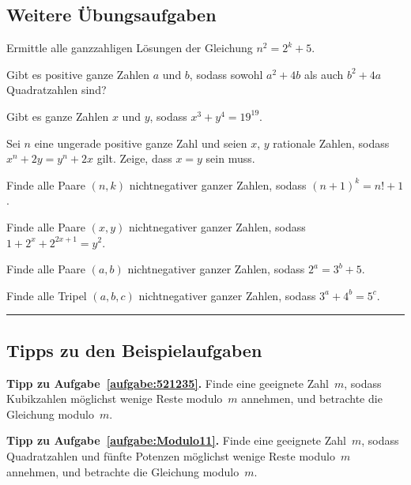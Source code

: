 \subsection*{Weitere Übungsaufgaben}
\begin{aufgabe*}\label{aufgabe:501044}
	Ermittle alle ganzzahligen Lösungen der Gleichung $n^2=2^k+5$.
\end{aufgabe*}
\begin{aufgabe*}
	Gibt es positive ganze Zahlen $a$ und $b$, sodass sowohl $a^2+4b$ als auch $b^2+4a$ Quadratzahlen sind?
\end{aufgabe*}
\begin{aufgabe*}
	Gibt es ganze Zahlen $x$ und $y$, sodass $x^3+y^4=19^{19}$.
\end{aufgabe*}
\begin{aufgabe*}
	Sei $n$ eine ungerade positive ganze Zahl und seien $x$, $y$ rationale Zahlen, sodass $x^n+2y=y^n+2x$ gilt. Zeige, dass $x=y$ sein muss.
\end{aufgabe*}
\begin{aufgabe*}[*]
	Finde alle Paare $(n,k)$ nichtnegativer ganzer Zahlen, sodass $(n+1)^k=n!+1$.
\end{aufgabe*}
\begin{aufgabe*}[*]
	Finde alle Paare $(x,y)$ nichtnegativer ganzer Zahlen, sodass $1+2^x+2^{2x+1}=y^2$.
\end{aufgabe*}
\begin{aufgabe*}[**]
	Finde alle Paare $(a,b)$ nichtnegativer ganzer Zahlen, sodass $2^a=3^b+5$.
\end{aufgabe*}
\begin{aufgabe*}[**]
	Finde alle Tripel $(a,b,c)$ nichtnegativer ganzer Zahlen, sodass $3^a+4^b=5^c$.
\end{aufgabe*}

\vfill\hrule\vspace{-1em}

\subsection*{Tipps zu den Beispielaufgaben}
\textbf{Tipp zu Aufgabe~\ref{aufgabe:521235}.} Finde eine geeignete Zahl~$m$, sodass Kubikzahlen möglichst wenige Reste modulo~$m$ annehmen, und betrachte die Gleichung modulo~$m$.

\textbf{Tipp zu Aufgabe~\ref{aufgabe:Modulo11}.} Finde eine geeignete Zahl~$m$, sodass Quadratzahlen und fünfte Potenzen möglichst wenige Reste modulo~$m$ annehmen, und betrachte die Gleichung modulo~$m$.


